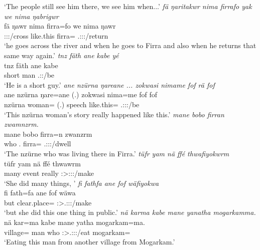 \begin{exe}
	\trans `The people still see him there, we see him when...'
	\emph{fä ŋaritakwr nima firrafo yak we nima ŋabrigwr}\\
	\gll fä ŋawr nima firra=fo  we nima ŋawr\\
	{\Dist} \Stsg:\Sbj:\Nonpast:\Ipfv/cross {like.this} firra={\All} \Tsg.\Masc:\Sbj:\Nonpast:\Ipfv/return\\
	\trans `he goes across the river and when he goes to Firra and also when he returns that same way again.'
	\emph{tnz fäth ane kabe yé}\\
	\gll tnz fäth ane kabe \\
	short \Dim{} {\Dem} man \Tsg.\Masc:\Nonpast:\Ipfv/be\\
	\trans `He is a short guy.'
	\emph{ane nzürna ŋareane ... zokwasi nimame fof rä fof}\\
	\gll ane nzürna ŋare=ane (.) zokwasi nima=me fof  fof\\
	{\Dem} nzürna woman={\Poss} (.) speech like.this={\Ins} {\Emph} \Tsg.\F:\Sbj:\Nonpast:\Ipfv/be {\Emph}\\
	\trans `This nzürna woman's story really happened like this.'
	\emph{mane bobo firran zwamnzrm.}\\
	\gll mane bobo firra=n zwanzrm\\
	who \Med.{\All} firra={\Loc} \Tsg.\F:\Sbj:\Pst:\Dur/dwell\\
	\trans `The nzürne who was living there in Firra.'
	\emph{tüfr yam nä ffé thwafiyokwrm}\\
	\gll tüfr yam nä ffé thwawrm\\
	many event {\Indf} really \Sg:\Sbj>\Stpl:\Obj:\Pst:\Dur/make\\
	\trans `She did many things, '
	\emph{fi fathfa ane fof wäfiyokwa}\\
	\gll fi fath=fa ane fof wäwa\\
	but clear.place={\Abl} {\Dem} {\Emph} \Sg:\Sbj>\Tsg.\F:\Obj:\Pst:\Ipfv/make\\
	\trans `but she did this one thing in public.'
	\emph{nä karma kabe mane yanatha mogarkamma.}\\
	\gll nä kar=ma kabe mane yatha mogarkam=ma.\\
	{\Indf} village={\Char} man who \Sg:\Sbj>\Tsg.\Masc:\Obj:\Pst:\Ipfv/eat mogarkam=\Char\\
	\trans `Eating this man from another village from Mogarkam.'

\end{exe}
